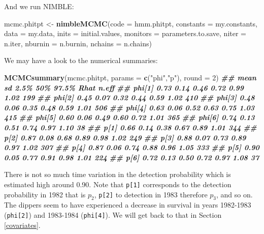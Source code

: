 \documentclass[
  12pt,
]{krantz}
\newenvironment{Shaded}{\begin{snugshade}}{\end{snugshade}}
\newcommand{\AttributeTok}[1]{\textcolor[rgb]{0.13,0.29,0.53}{#1}}
\newcommand{\DecValTok}[1]{\textcolor[rgb]{0.00,0.00,0.81}{#1}}
\newcommand{\DocumentationTok}[1]{\textcolor[rgb]{0.56,0.35,0.01}{\textbf{\textit{#1}}}}
\newcommand{\FunctionTok}[1]{\textcolor[rgb]{0.13,0.29,0.53}{\textbf{#1}}}
\newcommand{\NormalTok}[1]{#1}
\newcommand{\OtherTok}[1]{\textcolor[rgb]{0.56,0.35,0.01}{#1}}
\newcommand{\StringTok}[1]{\textcolor[rgb]{0.31,0.60,0.02}{#1}}
\begin{document}
And we run NIMBLE:

\begin{Shaded}
\begin{Highlighting}[]
\NormalTok{mcmc.phitpt }\OtherTok{\textless{}{-}} \FunctionTok{nimbleMCMC}\NormalTok{(}\AttributeTok{code =}\NormalTok{ hmm.phitpt,}
                          \AttributeTok{constants =}\NormalTok{ my.constants,}
                          \AttributeTok{data =}\NormalTok{ my.data,}
                          \AttributeTok{inits =}\NormalTok{ initial.values,}
                          \AttributeTok{monitors =}\NormalTok{ parameters.to.save,}
                          \AttributeTok{niter =}\NormalTok{ n.iter,}
                          \AttributeTok{nburnin =}\NormalTok{ n.burnin,}
                          \AttributeTok{nchains =}\NormalTok{ n.chains)}
\end{Highlighting}
\end{Shaded}

We may have a look to the numerical summaries:

\begin{Shaded}
\begin{Highlighting}[]
\FunctionTok{MCMCsummary}\NormalTok{(mcmc.phitpt, }\AttributeTok{params =} \FunctionTok{c}\NormalTok{(}\StringTok{"phi"}\NormalTok{,}\StringTok{"p"}\NormalTok{), }\AttributeTok{round =} \DecValTok{2}\NormalTok{)}
\DocumentationTok{\#\#        mean   sd 2.5\%  50\% 97.5\% Rhat n.eff}
\DocumentationTok{\#\# phi[1] 0.73 0.14 0.46 0.72  0.99 1.02   199}
\DocumentationTok{\#\# phi[2] 0.45 0.07 0.32 0.44  0.59 1.02   410}
\DocumentationTok{\#\# phi[3] 0.48 0.06 0.35 0.48  0.59 1.01   506}
\DocumentationTok{\#\# phi[4] 0.63 0.06 0.52 0.63  0.75 1.03   415}
\DocumentationTok{\#\# phi[5] 0.60 0.06 0.49 0.60  0.72 1.01   365}
\DocumentationTok{\#\# phi[6] 0.74 0.13 0.51 0.74  0.97 1.10    38}
\DocumentationTok{\#\# p[1]   0.66 0.14 0.38 0.67  0.89 1.01   344}
\DocumentationTok{\#\# p[2]   0.87 0.08 0.68 0.89  0.98 1.02   249}
\DocumentationTok{\#\# p[3]   0.88 0.07 0.73 0.89  0.97 1.02   307}
\DocumentationTok{\#\# p[4]   0.87 0.06 0.74 0.88  0.96 1.05   333}
\DocumentationTok{\#\# p[5]   0.90 0.05 0.77 0.91  0.98 1.01   224}
\DocumentationTok{\#\# p[6]   0.72 0.13 0.50 0.72  0.97 1.08    37}
\end{Highlighting}
\end{Shaded}

There is not so much time variation in the detection probability which is estimated high around 0.90. Note that \texttt{p{[}1{]}} corresponds to the detection probability in 1982 that is \(p_2\), \texttt{p{[}2{]}} to detection in 1983 therefore \(p_3\), and so on. The dippers seem to have experienced a decrease in survival in years 1982-1983 (\texttt{phi{[}2{]}}) and 1983-1984 (\texttt{phi{[}4{]}}). We will get back to that in Section \ref{covariates}.
\end{document}
